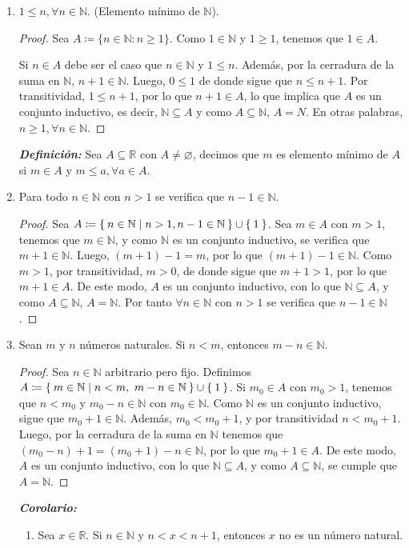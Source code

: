 \documentclass[11pt]{article}
\newcommand{\N}{\mathbb{N}}
\newcommand{\R}{\mathbb{R}}
\newcommand{\bfit}[1]{\textbf{\textit{#1}}}
\let\emptyset\varnothing
\let\set\Set
\let\union\cup
\begin{document}
\begin{enumerate}[label=\alph*)]
 \item $1\leq n, \forall n\in \N$. (Elemento mínimo de $\N$).
 \begin{proof} 
  Sea $A\coloneqq \{n\in \N: n\geq 1\}$. Como $1\in \N$ y $1\geq 1$, tenemos que $1\in A$.

  Si $n\in A$ debe ser el caso que $n\in \N$ y $1\leq n$. Además, por la cerradura de la suma en $\N$, $n+1\in \N$. Luego, $0 \leq 1$ de donde sigue que $n \leq n+1$. Por transitividad, $1\leq n+1$, por lo que $n+1\in A$, lo que implica que $A$ es un conjunto inductivo, es decir, $\N\subseteq A$ y como $A\subseteq \N$, $A=N$. En otras palabras, $n\geq 1, \forall n\in\N$.
 \end{proof}

 \bfit{Definición:}  Sea $A\subseteq \R$ con $A \neq \emptyset$, decimos que $m$ es elemento mínimo de $A$ si $m\in A$ y $m\leq a, \forall a\in A$.

 \item Para todo $n\in \N$ con $n>1$ se verifica que $n-1\in \N$.
 \begin{proof} 
  Sea $A \coloneqq \set{n\in \N | n>1, n-1\in \N}\union \set{1}$. Sea $m\in A$ con $m>1$, tenemos que $m\in \N$, y como $\N$ es un conjunto inductivo, se verifica que $m+1\in\N$. Luego, $(m+1)-1=m$, por lo que $(m+1)-1\in \N$. Como $m>1$, por transitividad, $m>0$, de donde sigue que $m+1>1$, por lo que $m+1\in A$. De este modo, $A$ es un conjunto inductivo, con lo que $\N \subseteq A$, y como $A\subseteq \N$, $A=\N$. Por tanto $\forall n\in \N$ con $n>1$ se verifica que $n-1\in \N$.
 \end{proof}

 \item Sean $m$ y $n$ números naturales. Si $n<m$, entonces $m-n\in\N$. 
 \begin{proof} 
  Sea $n\in \N$ arbitrario pero fijo. Definimos $A \coloneqq \set{m\in \N| n<m, \ m-n\in\N}\union \set{1}$. Si $m_0\in A$ con $m_0>1$, tenemos que $n<m_0$ y $m_0-n\in \N$ con $m_0\in \N$. Como $\N$ es un conjunto inductivo, sigue que $m_0+1\in \N$. Además, $m_0<m_0+1$, y por transitividad $n<m_0+1$. Luego, por la cerradura de la suma en $\N$ tenemos que $(m_0-n)+1 =(m_0+1)-n \in \N$, por lo que $m_0+1\in A$. De este modo, $A$ es un conjunto inductivo, con lo que $\N \subseteq A$, y como $A\subseteq \N$, se cumple que $A=\N$.
 \end{proof}

 \bfit{Corolario:} \begin{enumerate}[label=\roman*)]
  \item Sea $x\in \R$. Si $n\in \N$ y $n<x<n+1$, entonces $x$ no es un número natural.
  

\end{enumerate}
\end{enumerate}
\end{document}
